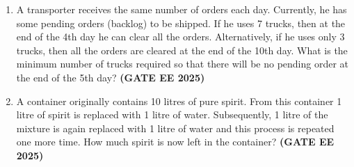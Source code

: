 \documentclass[journal,12pt,onecolumn]{IEEEtran}
\theoremstyle{remark}
\begin{document}
\begin{enumerate}
\begin{enumerate}
\end{enumerate}
\item  A transporter receives the same number of orders each day. Currently, he has some pending orders (backlog) to be shipped. If he uses 7 trucks, then at the end of the 4th day he can clear all the orders. Alternatively, if he uses only 3 trucks, then all the orders are cleared at the end of the 10th day. What is the minimum number of trucks required so that there will be no pending order at the end of the 5th day? \hfill \textbf{(GATE EE 2025)}  
\begin{enumerate}
\end{enumerate}
\item  A container originally contains 10 litres of pure spirit. From this container 1 litre of spirit is replaced with 1 litre of water. Subsequently, 1 litre of the mixture is again replaced with 1 litre of water and this process is repeated one more time. How much spirit is now left in the container?  \hfill \textbf{(GATE EE 2025)} 
\begin{enumerate}
\end{enumerate}
\end{enumerate}
\end{document}
